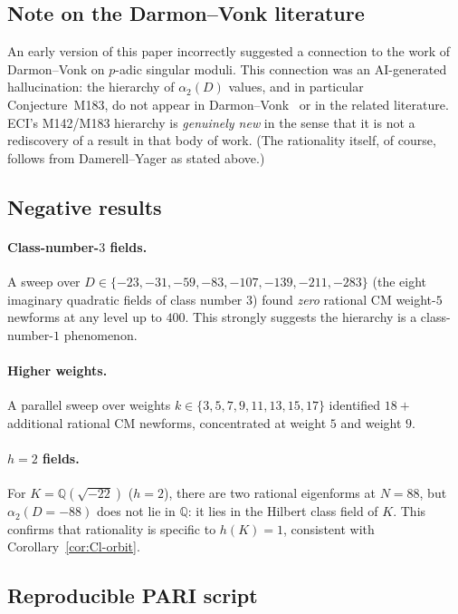 \documentclass[12pt]{amsart}
\theoremstyle{definition}
\newcommand{\Q}{\mathbb{Q}}
\begin{document}
\subsection{Note on the Darmon--Vonk literature}

An early version of this paper incorrectly suggested a connection to the
work of Darmon--Vonk on $p$-adic singular moduli.
This connection was an AI-generated hallucination: the hierarchy of
$\alpha_2(D)$ values, and in particular Conjecture~M183, do not appear
in Darmon--Vonk~\cite{DarmonVonk2021} or in the related literature.
ECI's M142/M183 hierarchy is \emph{genuinely new} in the sense that it is
not a rediscovery of a result in that body of work.
(The rationality itself, of course, follows from Damerell--Yager as stated
above.)

\subsection{Negative results}

\paragraph{Class-number-$3$ fields.}
A sweep over $D \in \{-23, -31, -59, -83, -107, -139, -211, -283\}$
(the eight imaginary quadratic fields of class number $3$)
found \emph{zero} rational CM weight-$5$ newforms at any level up to $400$.
This strongly suggests the hierarchy is a class-number-$1$ phenomenon.

\paragraph{Higher weights.}
A parallel sweep over weights $k \in \{3, 5, 7, 9, 11, 13, 15, 17\}$
identified $18+$ additional rational CM newforms, concentrated at
weight $5$ and weight $9$.

\paragraph{$h=2$ fields.}
For $K = \Q(\sqrt{-22})$ ($h=2$), there are two rational eigenforms at
$N = 88$, but $\alpha_2(D=-88)$ does not lie in $\Q$: it lies in the
Hilbert class field of $K$.
This confirms that rationality is specific to $h(K) = 1$, consistent with
Corollary~\ref{cor:Cl-orbit}.

\subsection{Reproducible PARI script}
\end{document}
